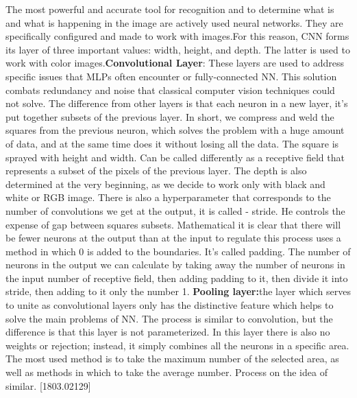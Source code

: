 \noindent The most powerful and accurate tool for recognition and to determine what is and what is happening in the image are actively used neural networks. They are specifically configured and made to work with images.For this reason, CNN forms its layer of three important values: width, height, and depth. The latter is used to work with color images.\textbf{Convolutional Layer}: These layers are used to address specific issues that MLPs often encounter or fully-connected NN. This solution combats redundancy and noise that classical computer vision techniques could not solve. The difference from other layers is that each neuron in a new layer, it's put together subsets of the previous layer. In short, we compress and weld the squares from the previous neuron, which solves the problem with a huge amount of data, and at the same time does it without losing all the data. The square is sprayed with height and width. Can be called differently as a receptive field that represents a subset of the pixels of the previous layer. The depth is also determined at the very beginning, as we decide to work only with black and white or RGB image. There is also a hyperparameter that corresponds to the number of convolutions we get at the output, it is called - stride. He controls the expense of gap between squares subsets. Mathematical it is clear that there will be fewer neurons at the output than at the input to regulate this process uses a method in which 0 is added to the boundaries. It's called padding. The number of neurons in the output we can calculate by taking away the number of neurons in the input number of receptive field, then adding padding to it, then divide it into stride, then adding to it only the number 1. \textbf{Pooling layer:}the layer which serves to unite as convolutional layers only has the distinctive feature which helps to solve the main problems of NN. The process is similar to convolution, but the difference is that this layer is not parameterized. In this layer there is also no weights or rejection; instead, it simply combines all the neurons in a specific area. The most used method is to take the maximum number of the selected area, as well as methods in which to take the average number. Process on the idea of similar. [1803.02129] 



\vspace{-0.3cm}


